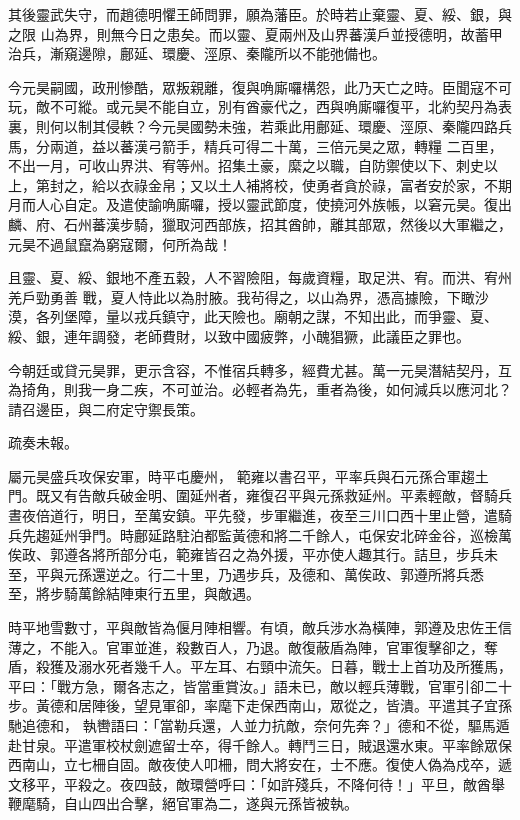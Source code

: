 \begin{pinyinscope}
 其後靈武失守，而趙德明懼王師問罪，願為藩臣。於時若止棄靈、夏、綏、銀，與之限
 山為界，則無今日之患矣。而以靈、夏兩州及山界蕃漢戶並授德明，故蓄甲治兵，漸窺邊隙，鄜延、環慶、涇原、秦隴所以不能弛備也。



 今元昊嗣國，政刑慘酷，眾叛親離，復與唃廝囉構怨，此乃天亡之時。臣聞寇不可玩，敵不可縱。或元昊不能自立，別有酋豪代之，西與唃廝囉復平，北約契丹為表裏，則何以制其侵軼？今元昊國勢未強，若乘此用鄜延、環慶、涇原、秦隴四路兵馬，分兩道，益以蕃漢弓箭手，精兵可得二十萬，三倍元昊之眾，轉糧
 二百里，不出一月，可收山界洪、宥等州。招集土豪，縻之以職，自防禦使以下、刺史以上，第封之，給以衣祿金帛；又以土人補將校，使勇者貪於祿，富者安於家，不期月而人心自定。及遣使諭唃廝囉，授以靈武節度，使撓河外族帳，以窘元昊。復出麟、府、石州蕃漢步騎，獵取河西部族，招其酋帥，離其部眾，然後以大軍繼之，元昊不過鼠竄為窮寇爾，何所為哉！



 且靈、夏、綏、銀地不產五穀，人不習險阻，每歲資糧，取足洪、宥。而洪、宥州羌戶勁勇善
 戰，夏人恃此以為肘腋。我茍得之，以山為界，憑高據險，下瞰沙漠，各列堡障，量以戎兵鎮守，此天險也。廟朝之謀，不知出此，而爭靈、夏、綏、銀，連年調發，老師費財，以致中國疲弊，小醜猖獗，此議臣之罪也。



 今朝廷或貸元昊罪，更示含容，不惟宿兵轉多，經費尤甚。萬一元昊潛結契丹，互為掎角，則我一身二疾，不可並治。必輕者為先，重者為後，如何減兵以應河北？請召邊臣，與二府定守禦長策。



 疏奏未報。



 屬元昊盛兵攻保安軍，時平屯慶州，
 範雍以書召平，平率兵與石元孫合軍趨土門。既又有告敵兵破金明、圍延州者，雍復召平與元孫救延州。平素輕敵，督騎兵晝夜倍道行，明日，至萬安鎮。平先發，步軍繼進，夜至三川口西十里止營，遣騎兵先趨延州爭門。時鄜延路駐泊都監黃德和將二千餘人，屯保安北碎金谷，巡檢萬俟政、郭遵各將所部分屯，範雍皆召之為外援，平亦使人趣其行。詰旦，步兵未至，平與元孫還逆之。行二十里，乃遇步兵，及德和、萬俟政、郭遵所將兵悉
 至，將步騎萬餘結陣東行五里，與敵遇。



 時平地雪數寸，平與敵皆為偃月陣相響。有頃，敵兵涉水為橫陣，郭遵及忠佐王信薄之，不能入。官軍並進，殺數百人，乃退。敵復蔽盾為陣，官軍復擊卻之，奪盾，殺獲及溺水死者幾千人。平左耳、右頸中流矢。日暮，戰士上首功及所獲馬，平曰：「戰方急，爾各志之，皆當重賞汝。」語未已，敵以輕兵薄戰，官軍引卻二十步。黃德和居陣後，望見軍卻，率麾下走保西南山，眾從之，皆潰。平遣其子宜孫馳追德和，
 執轡語曰：「當勒兵還，人並力抗敵，奈何先奔？」德和不從，驅馬遁赴甘泉。平遣軍校杖劍遮留士卒，得千餘人。轉鬥三日，賊退還水東。平率餘眾保西南山，立七柵自固。敵夜使人叩柵，問大將安在，士不應。復使人偽為戍卒，遞文移平，平殺之。夜四鼓，敵環營呼曰：「如許殘兵，不降何待！」平旦，敵酋舉鞭麾騎，自山四出合擊，絕官軍為二，遂與元孫皆被執。




\end{pinyinscope}
